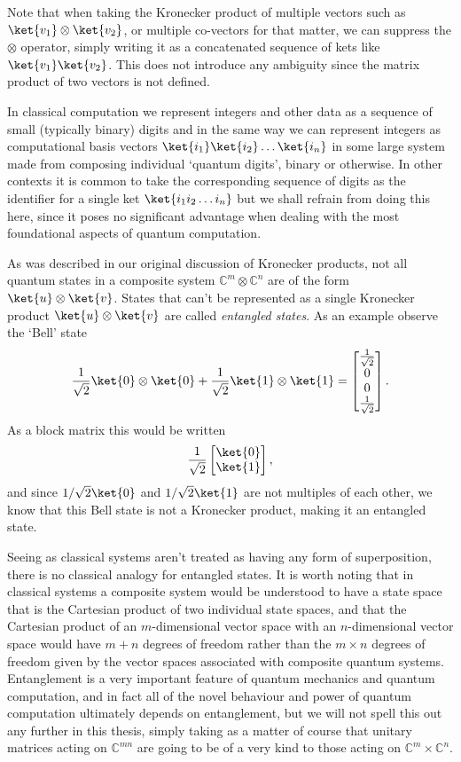Note that when taking the Kronecker product of multiple vectors such as $\ket{v_1}\otimes\ket{v_2}$, or multiple co-vectors for that matter, we can suppress the $\otimes$ operator, simply writing it as a concatenated sequence of kets like $\ket{v_1}\ket{v_2}$. This does not introduce any ambiguity since the matrix product of two vectors is not defined.

In classical computation we represent integers and other data as a sequence of small (typically binary) digits and in the same way we can represent integers as computational basis vectors $\ket{i_1}\ket{i_2}\dots\ket{i_n}$ in some large system made from composing individual `quantum digits', binary or otherwise. In other contexts it is common to take the corresponding sequence of digits as the identifier for a single ket $\ket{i_1i_2\dots i_n}$ but we shall refrain from doing this here, since it poses no significant advantage when dealing with the most foundational aspects of quantum computation.

As was described in our original discussion of Kronecker products, not all quantum states in a composite system $\mathbb{C}^m\otimes\mathbb{C}^n$ are of the form $\ket{u}\otimes\ket{v}$. States that can't be represented as a single Kronecker product $\ket{u}\otimes\ket{v}$ are called \emph{entangled states}. As an example observe the `Bell' state
\[\frac{1}{\sqrt{2}}\ket{0}\otimes\ket{0} + \frac{1}{\sqrt{2}}\ket{1}\otimes\ket{1} = \left[\begin{matrix}
\frac{1}{\sqrt{2}}\\
0\\
0\\
\frac{1}{\sqrt{2}}
\end{matrix}\right].\]
As a block matrix this would be written
\[\frac{1}{\sqrt{2}}\begin{bmatrix}
\ket{0} \\
\ket{1}
\end{bmatrix},\]
and since $1/\sqrt{2}\ket{0}$ and $1/\sqrt{2}\ket{1}$ are not multiples of each other, we know that this Bell state is not a Kronecker product, making it an entangled state.

Seeing as classical systems aren't treated as having any form of superposition, there is no classical analogy for entangled states. It is worth noting that in classical systems a composite system would be understood to have a state space that is the Cartesian product of two individual state spaces, and that the Cartesian product of an $m$-dimensional vector space with an $n$-dimensional vector space would have $m+n$ degrees of freedom rather than the $m\times n$ degrees of freedom given by the vector spaces associated with composite quantum systems.  Entanglement is a very important feature of quantum mechanics and quantum computation, and in fact all of the novel behaviour and power of quantum computation ultimately depends on entanglement, but we will not spell this out any further in this thesis, simply taking as a matter of course that unitary matrices acting on $\mathbb{C}^{mn}$ are going to be of a very kind to those acting on $\mathbb{C}^m\times \mathbb{C}^n$. 
